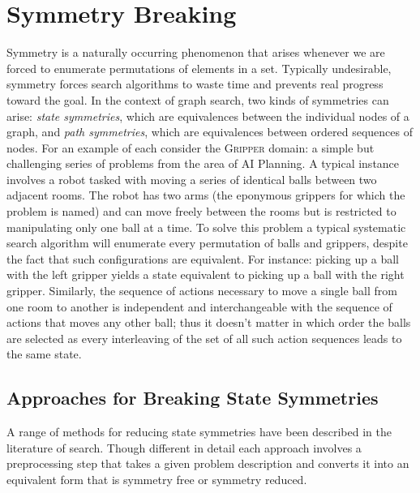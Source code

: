 \section{Symmetry Breaking}
\label{cha::lit::symmetry}
Symmetry is a naturally occurring phenomenon that arises whenever we are forced
to enumerate permutations of elements in a set. Typically
undesirable, symmetry forces search algorithms to waste time and prevents real 
progress toward the goal.
In the context of graph search, two kinds of symmetries can arise: \emph{state
symmetries}, which are equivalences between the individual nodes of a graph,
and \emph{path symmetries}, which are equivalences between ordered sequences of
nodes.
For an example of each consider the \textsc{Gripper} domain: a simple
but challenging series of problems from the area of AI Planning. A typical instance
involves a robot tasked with moving a series of identical balls between two adjacent rooms.
The robot has two arms (the eponymous grippers for which the problem is named) and can
move freely between the rooms but is restricted to manipulating only one
ball at a time.
To solve this problem a typical systematic search algorithm will enumerate every 
permutation of balls and grippers, despite the fact that such configurations are equivalent.
For instance: picking up a ball with the left gripper yields a state equivalent to 
picking up a ball with the right gripper.
 Similarly, the sequence of actions necessary to move a single ball from one room to another
is independent and interchangeable with the sequence of actions that moves any other ball;
thus it doesn't matter in which order the balls are selected as every interleaving of the set
of all such action sequences leads to the same state.

\subsection{Approaches for Breaking State Symmetries}
\label{cha::lit::symmetry::state}
A range of methods for reducing state symmetries have been described in the literature of 
search. Though different in detail each approach involves a preprocessing step that takes a given
problem description and converts it into an equivalent form that is symmetry free or symmetry 
reduced.


